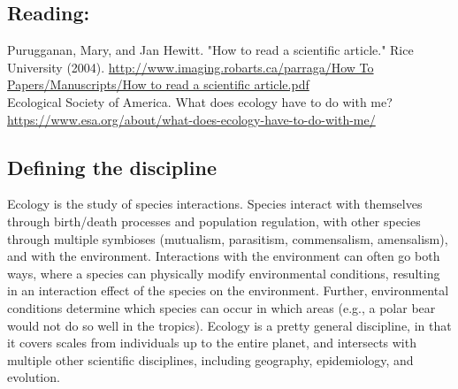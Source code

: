 \documentclass[12pt]{article}
\begin{document}
\subsection*{Reading:}

Purugganan, Mary, and Jan Hewitt. "How to read a scientific article." Rice University (2004). \url{http://www.imaging.robarts.ca/parraga/How To Papers/Manuscripts/How to read a scientific article.pdf} \\



Ecological Society of America. What does ecology have to do with me? \url{https://www.esa.org/about/what-does-ecology-have-to-do-with-me/}













\begin{center}
\noindent\hrulefill 
\end{center}



\clearpage





% 
% 









\subsection*{Defining the discipline}

Ecology is the study of species interactions. Species interact with themselves through birth/death processes and population regulation, with other species through multiple symbioses (mutualism, parasitism, commensalism, amensalism), and with the environment. Interactions with the environment can often go both ways, where a species can physically modify environmental conditions, resulting in an interaction effect of the species on the environment. Further, environmental conditions determine which species can occur in which areas (e.g., a polar bear would not do so well in the tropics). Ecology is a pretty general discipline, in that it covers scales from individuals up to the entire planet, and intersects with multiple other scientific disciplines, including geography, epidemiology, and evolution.
\end{document}
